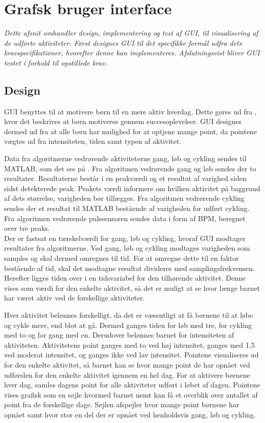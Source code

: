 \section{Grafsk bruger interface}
\textit{Dette afsnit omhandler design, implementering og test af GUI, til visualisering af de udførte aktiviteter. Først designes GUI til det specifikke formål udfra dets kravspecifikationer, hvorefter denne kan implementeres. Afslutningsvist bliver GUI testet i forhold til opstillede krav.}
\subsection{Design}
GUI benyttes til at motivere børn til en mere aktiv hverdag. Dette gøres ud fra , hvor det beskrives at børn motiveres gennem succesoplevelser. GUI designes dermed ud fra at alle børn har mulighed for at optjene mange point, da pointene vægtes ud fra intensiteten, tiden samt typen af aktivitet.

Data fra algoritmerne vedrørende aktiviteterne gang, løb og cykling sendes til MATLAB, som det ses på . Fra algoritmen vedrørende gang og løb sendes der to resultater. Resultaterne består i en peakværdi og et resultat af varighed siden sidst detekterede peak. Peakets værdi informere om hvilken aktivitet på baggrund af dets størrelse, varigheden bør tillægges. Fra algoritmen vedrørende cykling sendes der et resultat til MATLAB bestående af varigheden for udført cykling. Fra algoritmen vedrørende pulssensoren sendes data i form af BPM, beregnet over tre peaks. \\
Der er fastsat en tærskelværdi for gang, løb og cykling, hvoraf GUI modtager resultater fra algoritmerne. Ved gang, løb og cykling modtages varigheden som samples og skal dermed omregnes til tid. For at omregne dette til en faktor bestående af tid, skal det modtagne resultat divideres med samplingsfrekvensen. Herefter ligges tiden over i en tidsvariabel for den tilhørende aktivitet. Denne vises som værdi for den enkelte aktivitet, så det er muligt at se hvor længe barnet har været aktiv ved de forskellige aktiviteter.

Hver aktivitet belønnes forskelligt, da det er væsentligt at få børnene til at løbe og cykle mere, end blot at gå. Dermed ganges tiden for løb med tre, for cykling med to og for gang med en. Derudover belønnes barnet for intensiteten af aktiviteten. Aktivitetens point ganges med to ved høj intensitet, ganges med 1,5 ved moderat intensitet, og ganges ikke ved lav intensitet. Pointene visualiseres ud for den enkelte aktivitet, så barnet kan se hvor mange point de har opnået ved udførslen for den enkelte aktivitet igennem en hel dag. For at aktivere børnene hver dag, samles dagens point for alle aktiviteter udført i løbet af dagen. Pointene vises grafisk som en søjle hvormed barnet nemt kan få et overblik over antallet af point fra de forskellige dage. Søjlen afspejler hvor mange point børnene har opnået samt hvor stor en del der er opnået ved henholdsvis gang, løb og cykling.  


